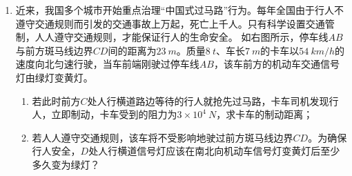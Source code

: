 \begin{enumerate}[leftmargin=0em]
\begin{enumerate}
\end{enumerate}
\begin{figure}[h!]
\flushright

\end{figure}



\item 
{}
近来，我国多个城市开始重点治理“中国式过马路”行为。每年全国由于行人不遵守交通规则而引发的交通事故上万起，死亡上千人。只有科学设置交通管制，人人遵守交通规则，才能保证行人的生命安全。 如右图所示，停车线$ AB $与前方斑马线边界$ CD $间的距离为$ 23 \ m $。质量$ 8\ t $、车长$ 7 \ m $的卡车以$ 54 \ km/h $的速度向北匀速行驶，当车前端刚驶过停车线$ AB $，该车前方的机动车交通信号灯由绿灯变黄灯。
\begin{enumerate}
\renewcommand{\labelenumi}{\arabic{enumi}.}
\item
若此时前方$ C $处人行横道路边等待的行人就抢先过马路，卡车司机发现行人，立即制动，卡车受到的阻力为$ 3 \times 10^4 \ N $，求卡车的制动距离；
\item 
若人人遵守交通规则，该车将不受影响地驶过前方斑马线边界$ CD $。为确保行人安全，$ D $处人行横道信号灯应该在南北向机动车信号灯变黄灯后至少多久变为绿灯？

\end{enumerate}
\begin{figure}[h!]
\flushright

\end{figure}
\end{enumerate}
